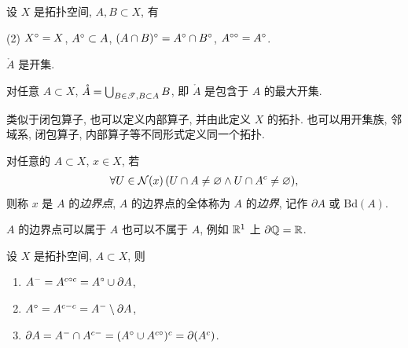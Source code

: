     \begin{Proposition}[内部的性质]
        设 $ X $ 是拓扑空间, $ A, B\subset X $, 有
        \begin{lpbn}(2)
            \task $ X^{\circ} =X $,
            \task $ A^{\circ}\subset A $,
            \task $ (A\cap B)^{\circ}=A^{\circ}\cap B^{\circ} $,
            \task $ A^{\circ\circ}=A^{\circ} $.
        \end{lpbn}
    \end{Proposition}

    \begin{Corollary}[内部的开性]
        $ \mathring{A} $ 是开集. 
    \end{Corollary}

    \begin{Theorem}[内部的刻画]
        对任意 $ A\subset X $, $ \mathring{A}=\bigcup_{B\in\mathscr{T}, B\subset A} B $, 即 $ \mathring{A} $ 是包含于 $ A $ 的最大开集. 
    \end{Theorem}

    \begin{Remark}
        类似于闭包算子, 也可以定义内部算子, 并由此定义 $ X $ 的拓扑. 也可以用开集族, 邻域系, 闭包算子, 内部算子等不同形式定义同一个拓扑. 
    \end{Remark}

    \begin{Definition}[边界点]
        对任意的 $ A\subset X $, $ x\in X $, 若
        \begin{align*}
            \forall U\in\mathcal{N}(x)\,(U\cap A\neq \varnothing\land U\cap A^{c}\neq \varnothing),
        \end{align*}
        则称 $ x $ 是 $ A $ 的\emph{边界点}, $ A $ 的边界点的全体称为 $ A $ 的\emph{边界}, 记作 $ \partial A $ 或 $ \mathrm{Bd}(A) $.
    \end{Definition}

    \begin{Remark}
        $ A $ 的边界点可以属于 $ A $ 也可以不属于 $ A $, 例如 $ \mathbb{R}^{1} $ 上 $ \partial \mathbb{Q}=\mathbb{R} $.
    \end{Remark}

    \begin{Proposition}[闭包, 内部与边界的关系]
        设 $ X $ 是拓扑空间, $ A\subset X $, 则
        \begin{enumerate}
            \item $ A^{-}=A^{c\circ c}=A^{\circ}\cup \partial A $,
            \item $ A^{\circ}=A^{c-c}=A^{-}\setminus\partial A $,
            \item $ \partial A=A^{-}\cap A^{c-}=(A^{\circ}\cup A^{c\circ})^{c}=\partial(A^{c}) $.
        \end{enumerate}
    \end{Proposition}


